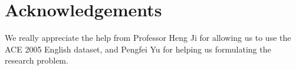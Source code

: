 \documentclass[11pt]{article}
\begin{document}
\section{Acknowledgements}
We really appreciate the help from Professor Heng Ji for allowing us to use the ACE 2005 English dataset, and Pengfei Yu for helping us formulating the research problem. 

\nocite{Ando2005,borschinger-johnson-2011-particle,andrew2007scalable,rasooli-tetrault-2015,goodman-etal-2016-noise,harper-2014-learning}


\appendix
\end{document}
